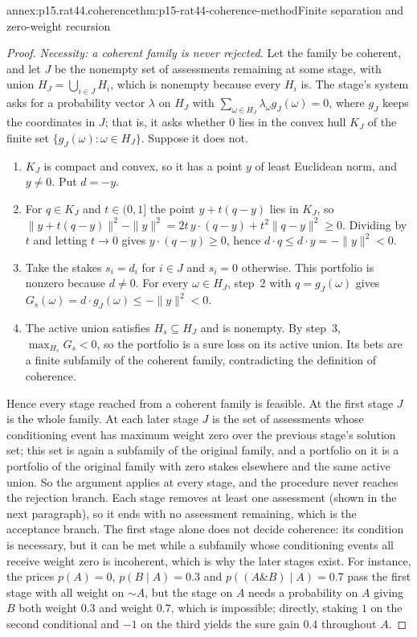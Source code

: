 \begin{annexitem}{annex:p15.rat44.coherence}{thm:p15-rat44-coherence-method}{Finite separation and zero-weight recursion}
\begin{proof}
\emph{Necessity: a coherent family is never rejected.} Let the family
be coherent, and let \(J\) be the nonempty set of assessments remaining
at some stage, with union \(H_J=\bigcup_{i\in J}H_i\), which is
nonempty because every \(H_i\) is. The stage's system asks for a
probability vector \(\lambda\) on \(H_J\) with
\(\sum_{\omega\in H_J}\lambda_\omega g_J(\omega)=0\), where
\(g_J\) keeps the coordinates in \(J\); that is, it asks whether
\(0\) lies in the convex hull \(K_J\) of the finite set
\(\{g_J(\omega):\omega\in H_J\}\). Suppose it does not.
\begin{enumerate}
\item \(K_J\) is compact and convex, so it has a point \(y\) of least
      Euclidean norm, and \(y\ne0\). Put \(d=-y\).
\item For \(q\in K_J\) and \(t\in(0,1]\) the point \(y+t(q-y)\) lies
      in \(K_J\), so
      \(\|y+t(q-y)\|^2-\|y\|^2=2t\,y\cdot(q-y)+t^2\|q-y\|^2\geq0\).
      Dividing by \(t\) and letting \(t\to0\) gives
      \(y\cdot(q-y)\geq0\), hence
      \(d\cdot q\leq d\cdot y=-\|y\|^2<0\).
\item Take the stakes \(s_i=d_i\) for \(i\in J\) and \(s_i=0\)
      otherwise. This portfolio is nonzero because \(d\ne0\). For every
      \(\omega\in H_J\), step~2 with \(q=g_J(\omega)\) gives
      \(G_s(\omega)=d\cdot g_J(\omega)\leq-\|y\|^2<0\).
\item The active union satisfies \(H_s\subseteq H_J\) and is nonempty.
      By step~3, \(\max_{H_s}G_s<0\), so the portfolio is a sure loss on
      its active union. Its bets are a finite subfamily of the coherent
      family, contradicting the definition of coherence.
\end{enumerate}
Hence every stage reached from a coherent family is feasible. At the
first stage \(J\) is the whole family. At each later stage \(J\) is the
set of assessments whose conditioning event has maximum weight zero
over the previous stage's solution set; this set is again a subfamily
of the original family, and a portfolio on it is a portfolio of the
original family with zero stakes elsewhere and the same active union.
So the argument applies at every stage, and the procedure never
reaches the rejection branch. Each stage removes at least one assessment
(shown in the next paragraph), so it ends with no assessment remaining,
which is the acceptance branch. The first stage alone does not decide
coherence: its condition is necessary, but it can be met while a
subfamily whose conditioning events all receive weight zero is
incoherent, which is why the later stages exist. For instance, the
prices \(p(A)=0\), \(p(B\mid A)=0.3\) and
\(p((A\mathbin{\&}B)\mid A)=0.7\) pass the first stage with all
weight on \(\sim A\), but the stage on \(A\) needs a probability on
\(A\) giving \(B\) both weight \(0.3\) and weight \(0.7\), which is
impossible; directly, staking \(1\) on the second conditional and
\(-1\) on the third yields the sure gain \(0.4\) throughout \(A\).


\end{proof}
\end{annexitem}
